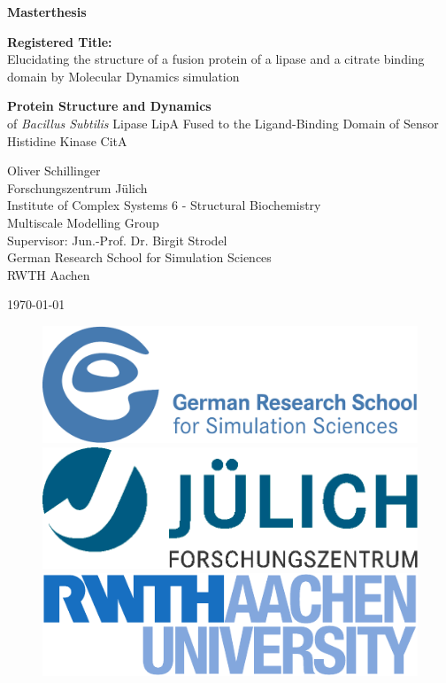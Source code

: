 \documentclass[english, a4paper, 12pt, titlepage, draft]{article}
\begin{document}

\begin{titlepage}
\begin{center}
{\huge \textbf{Masterthesis}}\\
\vspace{2cm}

{\textbf{Registered Title:} \\
Elucidating the structure of a fusion protein of a lipase and a citrate binding domain by Molecular Dynamics simulation
}

\vspace{2cm}
\begin{mdframed}
    \centering
{\large \textbf{Protein Structure and Dynamics} \\
\vspace{1cm}
of \textit{Bacillus Subtilis} Lipase LipA Fused to the Ligand-Binding Domain of Sensor Histidine Kinase CitA
}
\end{mdframed}

\vspace{2cm}

Oliver Schillinger \\
Forschungszentrum J\"ulich \\ Institute of Complex Systems 6 - Structural Biochemistry \\ Multiscale Modelling Group \\
Supervisor: Jun.-Prof. Dr. Birgit Strodel \\
\vspace{1cm}
German Research School for Simulation Sciences \\
RWTH Aachen

\vspace{1cm}

\today

\vfill

\begin{figure}[h!]
\includegraphics[width=.3\textwidth]{figures/logos/grs_logo.pdf}
\hspace{0.5cm}
\includegraphics[width=.3\textwidth]{figures/logos/fzj_logo.pdf}
\hspace{0.5cm}
\includegraphics[width=.3\textwidth]{figures/logos/rwth_logo.pdf}
\end{figure}
 
\end{center}
\end{titlepage}
\end{document}
